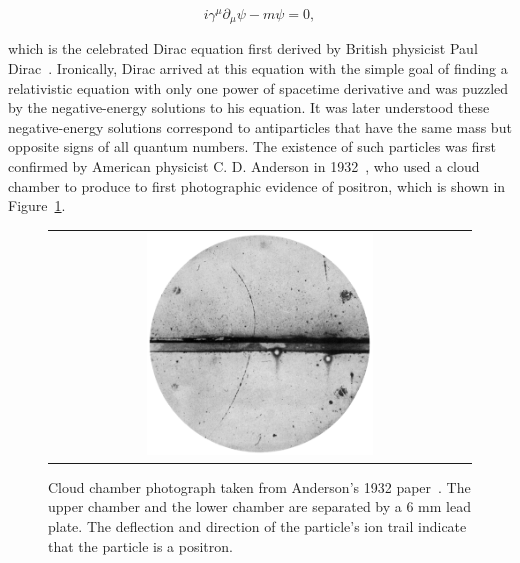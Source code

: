 \begin{equation}
\label{eq:Dirac}
i\gamma^{\mu}\partial_{\mu}\psi-m\psi=0,
\end{equation}

which is the celebrated Dirac equation first derived by British physicist Paul Dirac~\cite{Dirac:1928hu}. Ironically, Dirac arrived at this equation with the simple goal of finding a relativistic equation with only one power of spacetime derivative and was puzzled by the negative-energy solutions to his equation. It was later understood these negative-energy solutions correspond to antiparticles that have the same mass but opposite signs of all quantum numbers. The existence of such particles was first confirmed by American physicist C. D. Anderson in 1932~\cite{PhysRev.43.491}, who used a cloud chamber to produce to first photographic evidence of positron, which is shown in Figure~\ref{fig:Positron}.

\begin{figure}[tbh!]
 \begin{center}
 \begin{tabular}{c}
 \includegraphics[width=0.55\textwidth]{figures/Part1/Field/Positron}
 \end{tabular}
 \caption{Cloud chamber photograph taken from Anderson's 1932 paper~\cite{PhysRev.43.491}. The upper chamber and the lower chamber are separated by a 6 mm lead plate. The deflection and direction of the particle's ion trail indicate that the particle is a positron.}
 \label{fig:Positron}
 \end{center}
\end{figure}

